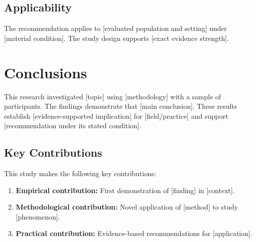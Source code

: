 \documentclass[11pt,letterpaper]{report}
\begin{document}
\section{Applicability}

\begin{limitations}
The recommendation applies to [evaluated population and setting] under
[material condition]. The study design supports [exact evidence strength].
\end{limitations}


\chapter{Conclusions}

\begin{executivesummary}[Conclusion]
This research investigated [topic] using [methodology] with a sample of  participants. The findings demonstrate that [main conclusion]. These results establish [evidence-supported implication] for [field/practice] and support [recommendation under its stated condition].
\end{executivesummary}

\section{Key Contributions}

\begin{keyfindings}
This study makes the following key contributions:
\begin{enumerate}
    \item \textbf{Empirical contribution:} First demonstration of [finding] in [context].
    \item \textbf{Methodological contribution:} Novel application of [method] to study [phenomenon].
    \item \textbf{Practical contribution:} Evidence-based recommendations for [application].
\end{enumerate}
\end{keyfindings}

\end{document}
